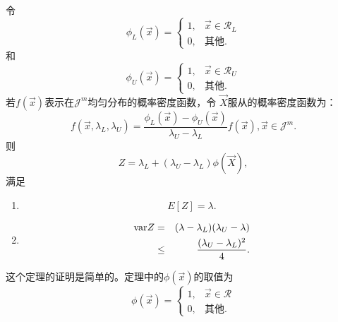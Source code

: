 \begin{theorem}{}
  令
  \begin{equation}
    \phi_L(\vec{x}) = \left\{
    \begin{array}{ll}
      1,& \vec{x} \in \mathscr{R}_L\\
      0,& \mbox{其他}.
      \end{array}
      \right.
      \label{eq::sta_L}
  \end{equation}
  和
  \begin{equation}
  \phi_U(\vec{x}) = \left\{
  \begin{array}{ll}
    1,& \vec{x} \in \mathscr{R}_U\\
    0,& \mbox{其他}.
    \end{array}
    \right.
    \label{eq::sta_U}
  \end{equation}
  若$f(\vec{x})$表示在$\mathscr{J}^m$均匀分布的概率密度函数，令
  $\vec{X}$服从的概率密度函数为：
  \begin{equation}
    f(\vec{x}, \lambda_L, \lambda_U) = \frac{\phi_L(\vec{x}) -
      \phi_U(\vec{x})}{\lambda_U - \lambda_L}f(\vec{x}), \vec{x} \in
    \mathscr{J}^m.
    \label{eq::hyperrectangle_pdf}
  \end{equation}
  则
  \begin{equation}
    Z = \lambda_L + (\lambda_U - \lambda_L) \phi(\vec{X}),
    \label{eq::hyper_est}
  \end{equation}
  满足
  \begin{enumerate}
  \item
    \begin{equation}
      E[Z] = \lambda.
      \label{eq::hyper_exp}
    \end{equation}
  \item
    \begin{eqnarray}
      \mathrm{var} Z & = & (\lambda - \lambda_L)(\lambda_U - \lambda)
      \label{eq::hyper_var}
      \\
      & \leq & \frac{(\lambda_U - \lambda_L)^2}{4}. \notag
    \end{eqnarray}
  \end{enumerate}
    \label{thm::hyperrectangle}
\end{theorem}

这个定理的证明是简单的。定理中的$\phi(\vec{x})$的取值为
\begin{equation}
  \phi(\vec{x}) = \left\{
  \begin{array}{ll}
    1,& \vec{x} \in \mathscr{R}\\
    0,& \mbox{其他}.
  \end{array}
  \right.
  \label{eq::sta}
\end{equation}


